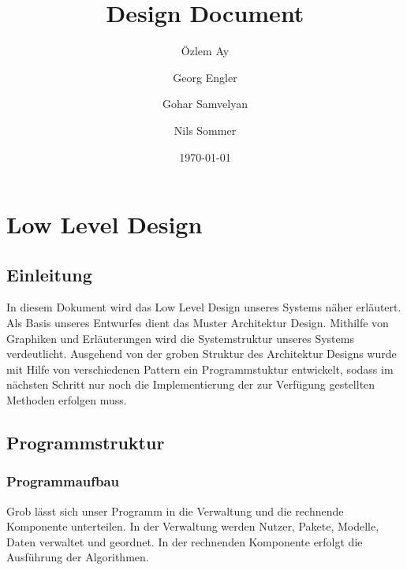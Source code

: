 \documentclass{book}
\title{Design Document}
\author{\"Ozlem  Ay \and Georg Engler \and Gohar
Samvelyan \and Nils Sommer}
\date{\today}
\begin{document}
\frontmatter
\maketitle
\tableofcontents
\mainmatter
\part{Low Level Design}

\chapter{Einleitung}
 In diesem Dokument wird das Low Level Design unseres Systems näher erläutert.
 Als Basis unseres Entwurfes dient das Muster Architektur Design. Mithilfe von Graphiken
 und Erläuterungen wird die Systemstruktur unseres Systems verdeutlicht. Ausgehend von der 
 groben Struktur des Architektur Designs wurde mit Hilfe von verschiedenen Pattern ein Programmstuktur
 entwickelt, sodass im nächsten Schritt nur noch die Implementierung der zur Verfügung gestellten
 Methoden erfolgen muss.
 
\chapter{Programmstruktur}

\section{Programmaufbau}
Grob lässt sich unser Programm in die Verwaltung und die rechnende Komponente unterteilen.
In der Verwaltung werden Nutzer, Pakete, Modelle, Daten verwaltet und geordnet. In der rechnenden
Komponente erfolgt die Ausführung der Algorithmen. 
\end{document}
